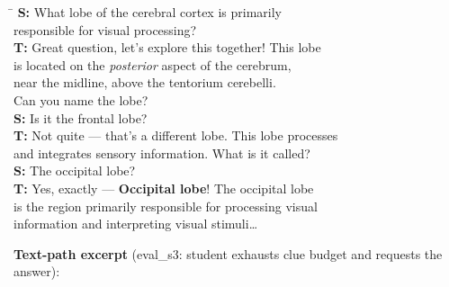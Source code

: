 \documentclass[11pt]{article}
\begin{document}
\begin{small}
\begin{tabbing}
\hspace{1.5em}\=\kill
\textbf{S:}\> What lobe of the cerebral cortex is primarily \\
            \> responsible for visual processing? \\[3pt]
\textbf{T:}\> Great question, let's explore this together! This lobe \\
            \> is located on the \emph{posterior} aspect of the cerebrum, \\
            \> near the midline, above the tentorium cerebelli. \\
            \> Can you name the lobe? \\[3pt]
\textbf{S:}\> Is it the frontal lobe? \\[3pt]
\textbf{T:}\> Not quite --- that's a different lobe. This lobe processes \\
            \> and integrates sensory information. What is it called? \\[3pt]
\textbf{S:}\> The occipital lobe? \\[3pt]
\textbf{T:}\> Yes, exactly --- \textbf{Occipital lobe}! The occipital lobe \\
            \> is the region primarily responsible for processing visual \\
            \> information and interpreting visual stimuli\ldots
\end{tabbing}
\end{small}

\medskip
\noindent\textbf{Text-path excerpt} (eval\_s3: student exhausts clue budget
and requests the answer):
\end{document}
